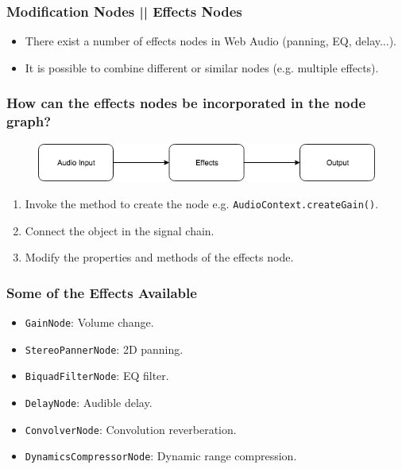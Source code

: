 \documentclass[screen, aspectratio=43]{beamer}
\begin{document}
%
\begin{frame}
\frametitle{Modification Nodes || Effects Nodes}
\begin{itemize}
\item There exist a number of effects nodes in Web Audio (panning, EQ, delay...).
\item It is possible to combine different or similar nodes (e.g. multiple effects).
\end{itemize}
\end{frame}
%
\begin{frame}
\frametitle{How can the effects nodes be incorporated in the node graph?}
   \begin{figure}
	\includegraphics[scale=0.35]{img/Routing-audio-nodes-02-low-pass-filter.png}
\end{figure}
\begin{enumerate}
\item Invoke the method to create the node e.g. \texttt{AudioContext.createGain()}.
\item Connect the object in the signal chain.
\item Modify the properties and methods of the effects node.
\end{enumerate}
\end{frame}
%
\begin{frame}
\frametitle{Some of the Effects Available}
\begin{itemize}
\item \texttt{GainNode}: Volume change.
\item \texttt{StereoPannerNode}: 2D panning.
\item \texttt{BiquadFilterNode}: EQ filter.
\item \texttt{DelayNode}: Audible delay.
\item \texttt{ConvolverNode}: Convolution reverberation.
\item \texttt{DynamicsCompressorNode}: Dynamic range compression.
\end{itemize}
\end{frame}
\end{document}

